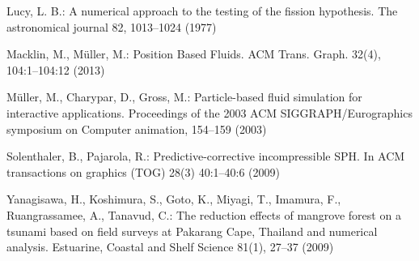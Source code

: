 \documentclass{llncs}
\begin{document}
\begin{thebibliography}{14}
 Lucy, L. B.: A numerical approach to the testing of the fission
  hypothesis. The astronomical journal 82, 1013--1024 (1977)

 Macklin, M., M\"{u}ller, M.: Position Based Fluids. ACM
  Trans. Graph. 32(4), 104:1--104:12 (2013)

 M\"{u}ller, M., Charypar, D., Gross, M.: Particle-based fluid
  simulation for interactive applications. Proceedings of the 2003 ACM
  SIGGRAPH/Eurographics symposium on Computer animation, 154--159 (2003)

 Solenthaler, B., Pajarola, R.: Predictive-corrective
  incompressible SPH. In ACM transactions on graphics (TOG) 28(3) 40:1--40:6 (2009)

 Yanagisawa, H., Koshimura, S., Goto, K., Miyagi, T., Imamura,
  F., Ruangrassamee, A., Tanavud, C.: The reduction effects of mangrove forest on a
  tsunami based on field surveys at Pakarang Cape, Thailand and numerical
  analysis. Estuarine, Coastal and Shelf Science 81(1), 27--37 (2009)

\end{thebibliography}
\end{document}
